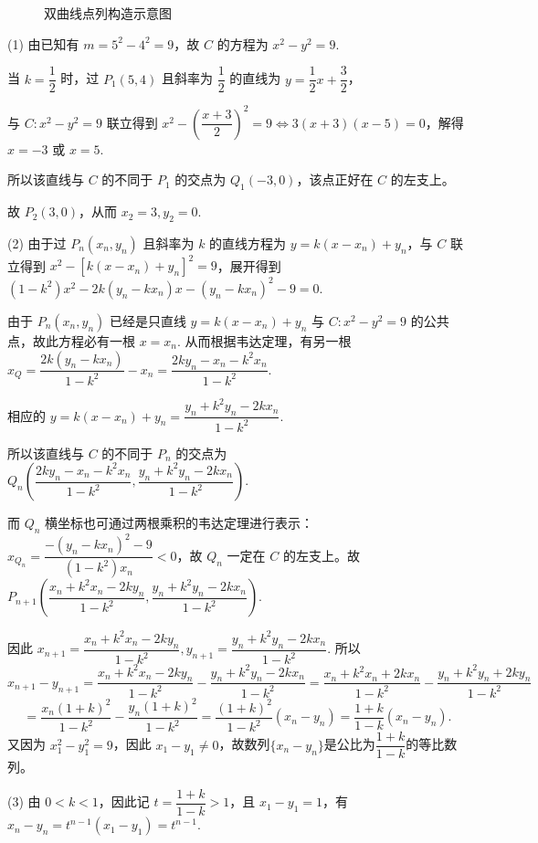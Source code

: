 \begin{solutions}
\begin{figure}[htbp]
    \centering

    \caption{双曲线点列构造示意图}
\end{figure}

(1) 由已知有 $m=5^2-4^2=9$，故 $C$ 的方程为 $x^2-y^2=9$.

当 $k=\dfrac{1}{2}$ 时，过 $P_1(5,4)$ 且斜率为 $\dfrac{1}{2}$ 的直线为 $y=\dfrac{1}{2}x+\dfrac{3}{2}$，

与 $C: x^2-y^2=9$ 联立得到 $x^2-\left(\dfrac{x+3}{2}\right)^2=9 \Leftrightarrow 3(x+3)(x-5)=0$，解得 $x=-3$ 或 $x=5$.

所以该直线与 $C$ 的不同于 $P_1$ 的交点为 $Q_1(-3,0)$，该点正好在 $C$ 的左支上。

故 $P_2(3,0)$，从而 $x_2=3, y_2=0$.

(2) 由于过 $P_n(x_n, y_n)$ 且斜率为 $k$ 的直线方程为 $y=k(x-x_n)+y_n$，与 $C$ 联立得到
$x^2-[k(x-x_n)+y_n]^2=9$，展开得到 $(1-k^2)x^2-2k(y_n-kx_n)x-(y_n-kx_n)^2-9=0$.

由于 $P_n(x_n, y_n)$ 已经是只直线 $y=k(x-x_n)+y_n$ 与 $C: x^2-y^2=9$ 的公共点，故此方程必有一根 $x=x_n$. 从而根据韦达定理，有另一根 $x_Q = \dfrac{2k(y_n-kx_n)}{1-k^2}-x_n = \dfrac{2ky_n-x_n-k^2x_n}{1-k^2}$.

相应的 $y=k(x-x_n)+y_n = \dfrac{y_n+k^2y_n-2kx_n}{1-k^2}$.

所以该直线与 $C$ 的不同于 $P_n$ 的交点为 $Q_n\left(\dfrac{2ky_n-x_n-k^2x_n}{1-k^2}, \dfrac{y_n+k^2y_n-2kx_n}{1-k^2}\right)$.

而 $Q_n$ 横坐标也可通过两根乘积的韦达定理进行表示：$x_{Q_n} = \dfrac{-(y_n-kx_n)^2-9}{(1-k^2)x_n} < 0$，故 $Q_n$ 一定在 $C$ 的左支上。故 $P_{n+1}\left(\dfrac{x_n+k^2x_n-2ky_n}{1-k^2}, \dfrac{y_n+k^2y_n-2kx_n}{1-k^2}\right)$.

因此 $x_{n+1} = \dfrac{x_n+k^2x_n-2ky_n}{1-k^2}, y_{n+1} = \dfrac{y_n+k^2y_n-2kx_n}{1-k^2}$.
所以
\[
x_{n+1}-y_{n+1} = \frac{x_n+k^2x_n-2ky_n}{1-k^2} - \frac{y_n+k^2y_n-2kx_n}{1-k^2} = \frac{x_n+k^2x_n+2kx_n}{1-k^2} - \frac{y_n+k^2y_n+2ky_n}{1-k^2} 
\]
\[
= \frac{x_n(1+k)^2}{1-k^2} - \frac{y_n(1+k)^2}{1-k^2} = \frac{(1+k)^2}{1-k^2}(x_n-y_n) = \frac{1+k}{1-k}(x_n-y_n).
\]
又因为 $x_1^2-y_1^2=9$，因此 $x_1-y_1 \neq 0$，故数列$\{x_n-y_n\}$是公比为$\dfrac{1+k}{1-k}$的等比数列。

(3) 由 $0<k<1$，因此记 $t=\dfrac{1+k}{1-k}>1$，且 $x_1-y_1=1$，有 $x_n-y_n=t^{n-1}(x_1-y_1)=
t^{n-1}$.


\end{solutions}
